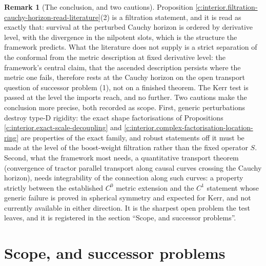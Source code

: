 \documentclass[11pt]{article}
\theoremstyle{definition}
\newtheorem{remark}[theorem]{Remark}
\theoremstyle{plain}
\begin{document}
\begin{remark}[The conclusion, and two cautions]\label{c:note.interior.conclusion-two-cautions}
Proposition \ref{c:interior.filtration-cauchy-horizon-read-literature}(2) is a filtration statement, and it is read as exactly that: survival at the perturbed Cauchy horizon is ordered by derivative level, with the divergence in the nilpotent slots, which is the structure the framework predicts. What the literature does not supply is a strict separation of the conformal from the metric description at fixed derivative level: the framework's central claim, that the ascended description persists where the metric one fails, therefore rests at the Cauchy horizon on the open transport question of successor problem (1), not on a finished theorem. The Kerr test is passed at the level the imports reach, and no further. Two cautions make the conclusion more precise, both recorded as scope. First, generic perturbations destroy type-D rigidity: the exact shape factorisations of Propositions \ref{c:interior.exact-scale-decoupling} and \ref{c:interior.complex-factorisation-location-ring} are properties of the exact family, and robust statements off it must be made at the level of the boost-weight filtration rather than the fixed operator $S$. Second, what the framework most needs, a quantitative transport theorem (convergence of tractor parallel transport along causal curves crossing the Cauchy horizon), needs integrability of the connection along such curves: a property strictly between the established $C^0$ metric extension and the $C^1$ statement whose generic failure is proved in spherical symmetry and expected for Kerr, and not currently available in either direction. It is the sharpest open problem the test leaves, and it is registered in the section ``Scope, and successor problems''.
\end{remark}

\section{Scope, and successor problems}
\end{document}
